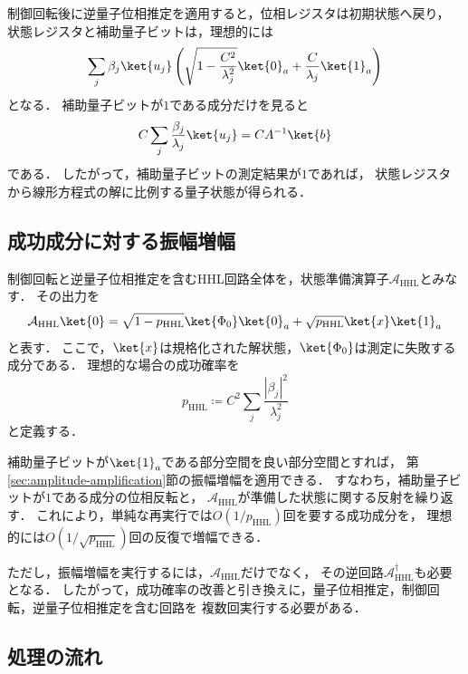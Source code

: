 制御回転後に逆量子位相推定を適用すると，位相レジスタは初期状態へ戻り，
状態レジスタと補助量子ビットは，理想的には
\begin{align*}
  \sum_j\beta_j\ket{u_j}
  \left(
    \sqrt{1-\frac{C^2}{\lambda_j^2}}\ket{0}_{a}
    +\frac{C}{\lambda_j}\ket{1}_{a}
  \right)
\end{align*}
となる．
補助量子ビットが$1$である成分だけを見ると
\begin{align*}
  C\sum_j\frac{\beta_j}{\lambda_j}\ket{u_j}
  =
  CA^{-1}\ket{b}
\end{align*}
である．
したがって，補助量子ビットの測定結果が$1$であれば，
状態レジスタから線形方程式の解に比例する量子状態が得られる．

\subsection{成功成分に対する振幅増幅}
\label{subsec:amplitude-amplification-role-in-hhl}

制御回転と逆量子位相推定を含むHHL回路全体を，状態準備演算子$\mathcal{A}_{\mathrm{HHL}}$とみなす．
その出力を
\begin{equation}
  \mathcal{A}_{\mathrm{HHL}}\ket{0}
  =
  \sqrt{1-p_{\mathrm{HHL}}}\ket{\Phi_0}\ket{0}_{a}
  +\sqrt{p_{\mathrm{HHL}}}\ket{x}\ket{1}_{a}
  \label{eq:hhl-good-bad-decomposition}
\end{equation}
と表す．
ここで，$\ket{x}$は規格化された解状態，$\ket{\Phi_0}$は測定に失敗する成分である．
理想的な場合の成功確率を
\begin{equation}
  p_{\mathrm{HHL}}
  \coloneq
  C^2\sum_j\frac{|\beta_j|^2}{\lambda_j^2}
  \label{eq:hhl-subroutine-success-probability}
\end{equation}
と定義する．

補助量子ビットが$\ket{1}_{a}$である部分空間を良い部分空間とすれば，
第\ref{sec:amplitude-amplification}節の振幅増幅を適用できる．
すなわち，補助量子ビットが$1$である成分の位相反転と，
$\mathcal{A}_{\mathrm{HHL}}$が準備した状態に関する反射を繰り返す．
これにより，単純な再実行では$O(1/p_{\mathrm{HHL}})$回を要する成功成分を，
理想的には$O(1/\sqrt{p_{\mathrm{HHL}}})$回の反復で増幅できる．

ただし，振幅増幅を実行するには，$\mathcal{A}_{\mathrm{HHL}}$だけでなく，
その逆回路$\mathcal{A}_{\mathrm{HHL}}^{\dagger}$も必要となる．
したがって，成功確率の改善と引き換えに，量子位相推定，制御回転，逆量子位相推定を含む回路を
複数回実行する必要がある．

\subsection{処理の流れ}
\label{subsec:hhl-subroutine-flow}

